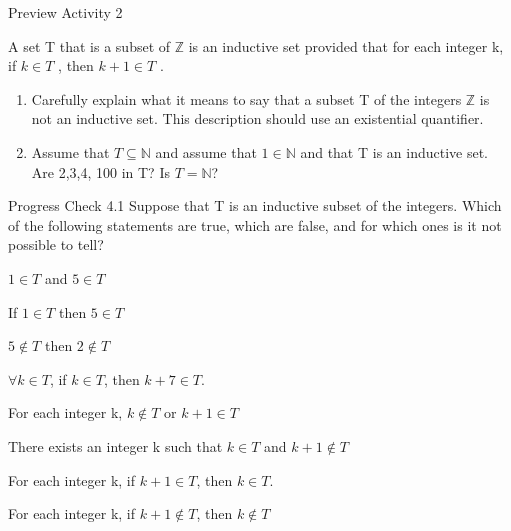 \documentclass{beamer}
\begin{document}
\begin{frame}{Preview Activity 2}
    \begin{definition}
    A set T that is a subset of $\mathbb{Z}$ is an inductive set provided that for each integer k, if $k \in T$ , then $k+1 \in T$ .
    \end{definition}
    
    \begin{enumerate}
        \item Carefully explain what it means to say that a subset T of the integers $\mathbb{Z}$ is not an inductive set. This description should use an existential quantifier.
        \begin{enumerate}
        \end{enumerate}
        \item Assume that $T \subseteq \mathbb{N}$ and assume that $1 \in \mathbb{N}$ and that T is an inductive set.  Are 2,3,4, 100 in T?  Is $T = \mathbb{N}$?
    \end{enumerate}
\end{frame}

\begin{frame}{Progress Check 4.1}
    Suppose that T is an inductive subset of the integers. Which of the following
statements are true, which are false, and for which ones is it not possible to tell?
\begin{enumerate}
    \begin{multicols}{2}
        \item $1 \in T$ and $5 \in T$
        \item If $1 \in T$ then $5 \in T$
        \item $5 \not \in T$ then $2 \not \in T$
        \item $\forall k \in T$, if $k \in T$, then $k+7 \in T$.
        \item For each integer k, $k \not \in T$ or $k+1 \in T$
        \item There exists an integer k such that $k \in T$ and $k+1 \not \in T$
        \item For each integer k, if $k+1 \in T$, then $k \in T$.
        \item For each integer k, if $k+1 \not \in T$, then $k \not \in T$
    \end{multicols}
\end{enumerate}
\end{frame}
\end{document}

